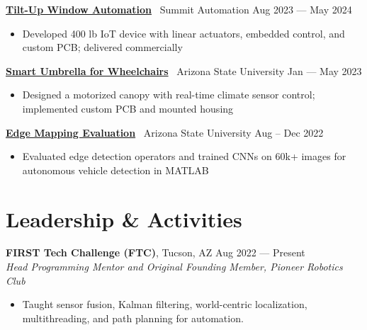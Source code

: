\documentclass[10pt]{article}
\begin{document}
\textbf{\href{https://www.youtube.com/watch?v=i5I38tLkD6o}{Tilt-Up Window Automation}} \textbar\ Summit Automation \hfill Aug 2023 --- May 2024
\begin{itemize}
  \item Developed 400 lb IoT device with linear actuators, embedded control, and custom PCB; delivered commercially
\end{itemize}
\textbf{\href{https://EGR314-Team205.github.io}{Smart Umbrella for Wheelchairs}} \textbar\ Arizona State University \hfill Jan --- May 2023
\begin{itemize}
  \item Designed a motorized canopy with real-time climate sensor control; implemented custom PCB and mounted housing
\end{itemize}
\textbf{\href{https://github.com/MGross21/EdgeMappingResearchProject}{Edge Mapping Evaluation}} \textbar\ Arizona State University \hfill Aug -- Dec 2022
\begin{itemize}
  \item Evaluated edge detection operators and trained CNNs on 60k+ images for autonomous vehicle detection in MATLAB
\end{itemize}
\section*{Leadership \& Activities}
\textbf{FIRST Tech Challenge (FTC)}, Tucson, AZ \hfill Aug 2022 --- Present \\
\textit{Head Programming Mentor and Original Founding Member, Pioneer Robotics Club}
\begin{itemize}
  \item Taught sensor fusion, Kalman filtering, world-centric localization, multithreading, and path planning for automation.
\end{itemize}

\end{document}
